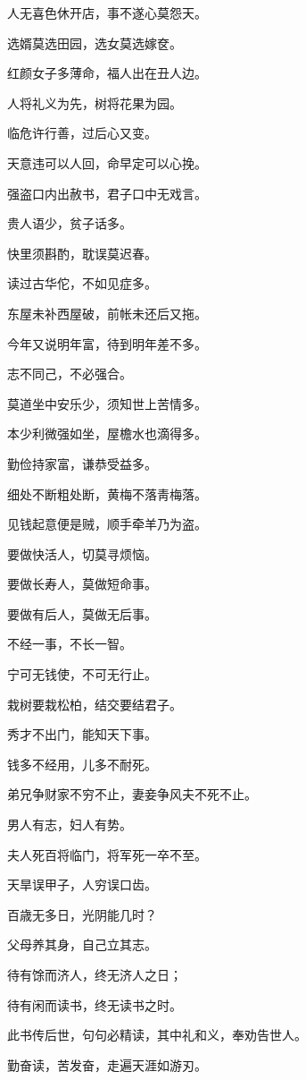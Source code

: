 \documentclass[12pt,oneside]{book}
\begin{document}
人无喜色休开店，事不遂心莫怨天。

选婿莫选田园，选女莫选嫁奁。

红颜女子多薄命，福人出在丑人边。

人将礼义为先，树将花果为园。

临危许行善，过后心又变。

天意违可以人回，命早定可以心挽。

强盗口内出赦书，君子口中无戏言。

贵人语少，贫子话多。

快里须斟酌，耽误莫迟春。

读过古华佗，不如见症多。

东屋未补西屋破，前帐未还后又拖。

今年又说明年富，待到明年差不多。

志不同己，不必强合。

莫道坐中安乐少，须知世上苦情多。

本少利微强如坐，屋檐水也滴得多。

勤俭持家富，谦恭受益多。

细处不断粗处断，黄梅不落靑梅落。

见钱起意便是贼，顺手牵羊乃为盗。

要做快活人，切莫寻烦恼。

要做长寿人，莫做短命事。

要做有后人，莫做无后事。

不经一事，不长一智。

宁可无钱使，不可无行止。

栽树要栽松柏，结交要结君子。

秀才不出门，能知天下事。

钱多不经用，儿多不耐死。

弟兄争财家不穷不止，妻妾争风夫不死不止。

男人有志，妇人有势。

夫人死百将临门，将军死一卒不至。

天旱误甲子，人穷误口齿。

百歳无多日，光阴能几时？

父母养其身，自己立其志。

待有馀而济人，终无济人之日；

待有闲而读书，终无读书之时。

此书传后世，句句必精读，其中礼和义，奉劝告世人。

勤奋读，苦发奋，走遍天涯如游刃。
\end{document}
